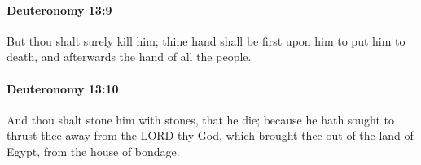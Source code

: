 		\paragraph{Deuteronomy 13:9} %
			\label{DEUTERONOMY-13-9}

			But thou shalt surely kill him; thine hand shall be first upon him to put him to death, and afterwards the hand of all the people.


		\paragraph{Deuteronomy 13:10} %
			\label{DEUTERONOMY-13-10}

			And thou shalt stone him with stones, that he die; because he hath sought to thrust thee away from the LORD thy God, which brought thee out of the land of Egypt, from the house of bondage.


